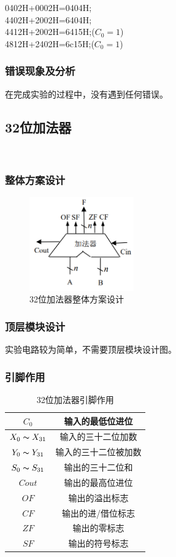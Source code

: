 \documentclass{article}
\begin{document}
    0402H+0002H=0404H;\\
    4402H+2002H=6404H;\\
    4412H+2002H=6415H;($C_{0}=1$)\\
    4812H+2402H=6c15H;($C_{0}=1$)\\
    \subsubsection{错误现象及分析}
    在完成实验的过程中，没有遇到任何错误。
    
    \subsection{32位加法器}\
    \subsubsection{整体方案设计}
    \begin{figure}[H]
    \centering
    \includegraphics[width=0.4\textwidth]{4.1.png}
    \caption{32位加法器整体方案设计}
    \end{figure}

    \subsubsection{顶层模块设计}
    实验电路较为简单，不需要顶层模块设计图。
    \subsubsection{引脚作用}
    \begin{table}[H]
    \centering
    \begin{tabular}{|c|c|}
        \hline
        $C_{0}$  & 输入的最低位进位 \\ \hline
        $X_{0}\thicksim X_{31}$ & 输入的三十二位加数 \\ \hline
        $Y_{0}\thicksim Y_{31}$   & 输入的三十二位被加数 \\ \hline
        $S_{0}\thicksim S_{31}$   & 输出的三十二位和 \\ \hline
        $Cout$   & 输出的最高位进位 \\ \hline
        $OF$   & 输出的溢出标志 \\ \hline
        $CF$   & 输出的进/借位标志 \\ \hline
        $ZF$   & 输出的零标志 \\ \hline
        $SF$   & 输出的符号标志 \\ \hline
    \end{tabular}
    \caption{32位加法器引脚作用}
    \end{table}
\end{document}
